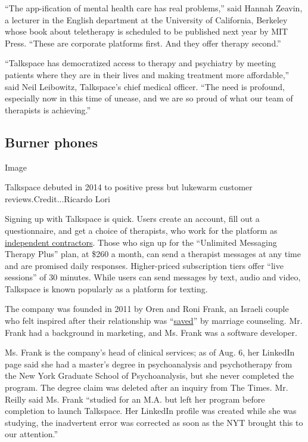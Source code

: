 ``The app-ification of mental health care has real problems,'' said
Hannah Zeavin, a lecturer in the English department at the University of
California, Berkeley whose book about teletherapy is scheduled to be
published next year by MIT Press. ``These are corporate platforms first.
And they offer therapy second.''

``Talkspace has democratized access to therapy and psychiatry by meeting
patients where they are in their lives and making treatment more
affordable,'' said Neil Leibowitz, Talkspace's chief medical officer.
``The need is profound, especially now in this time of unease, and we
are so proud of what our team of therapists is achieving.''

\hypertarget{burner-phones}{%
\subsection{Burner phones}\label{burner-phones}}

Image

Talkspace debuted in 2014 to positive press but lukewarm customer
reviews.Credit...Ricardo Lori

Signing up with Talkspace is quick. Users create an account, fill out a
questionnaire, and get a choice of therapists, who work for the platform
as
\href{https://www.theverge.com/2016/12/19/14004442/talkspace-therapy-app-reviews-patient-safety-privacy-liability-online}{independent
contractors}. Those who sign up for the ``Unlimited Messaging Therapy
Plus'' plan, at \$260 a month, can send a therapist messages at any time
and are promised daily responses. Higher-priced subscription tiers offer
``live sessions'' of 30 minutes. While users can send messages by text,
audio and video, Talkspace is known popularly as a platform for texting.

The company was founded in 2011 by Oren and Roni Frank, an Israeli
couple who felt inspired after their relationship was
``\href{https://blogs.wsj.com/venturecapital/2014/05/12/talkspace-raises-2-5-million-to-deliver-affordable-therapy-online/}{saved}''
by marriage counseling. Mr. Frank had a background in marketing, and Ms.
Frank was a software developer.

Ms. Frank is the company's head of clinical services; as of Aug. 6, her
LinkedIn page said she had a master's degree in psychoanalysis and
psychotherapy from the New York Graduate School of Psychoanalysis, but
she never completed the program. The degree claim was deleted after an
inquiry from The Times. Mr. Reilly said Ms. Frank ``studied for an M.A.
but left her program before completion to launch Talkspace. Her LinkedIn
profile was created while she was studying, the inadvertent error was
corrected as soon as the NYT brought this to our attention.''

